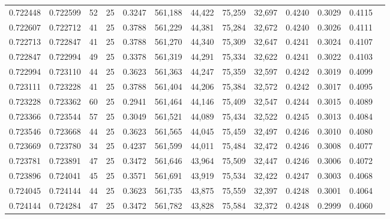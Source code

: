 \begin{tabular}{rrrrrrrrrrrrr}
0.722448 & 0.722599 &    52 &  25 &                                     0.3247 & 561,188 &  44,422 &  75,259 &  32,697 & 0.4240 & 0.3029 & 0.4115 \\
0.722607 & 0.722712 &    41 &  25 &                                     0.3788 & 561,229 &  44,381 &  75,284 &  32,672 & 0.4240 & 0.3026 & 0.4111 \\
0.722713 & 0.722847 &    41 &  25 &                                     0.3788 & 561,270 &  44,340 &  75,309 &  32,647 & 0.4241 & 0.3024 & 0.4107 \\
0.722847 & 0.722994 &    49 &  25 &                                     0.3378 & 561,319 &  44,291 &  75,334 &  32,622 & 0.4241 & 0.3022 & 0.4103 \\
0.722994 & 0.723110 &    44 &  25 &                                     0.3623 & 561,363 &  44,247 &  75,359 &  32,597 & 0.4242 & 0.3019 & 0.4099 \\
0.723111 & 0.723228 &    41 &  25 &                                     0.3788 & 561,404 &  44,206 &  75,384 &  32,572 & 0.4242 & 0.3017 & 0.4095 \\
0.723228 & 0.723362 &    60 &  25 &                                     0.2941 & 561,464 &  44,146 &  75,409 &  32,547 & 0.4244 & 0.3015 & 0.4089 \\
0.723366 & 0.723544 &    57 &  25 &                                     0.3049 & 561,521 &  44,089 &  75,434 &  32,522 & 0.4245 & 0.3013 & 0.4084 \\
0.723546 & 0.723668 &    44 &  25 &                                     0.3623 & 561,565 &  44,045 &  75,459 &  32,497 & 0.4246 & 0.3010 & 0.4080 \\
0.723669 & 0.723780 &    34 &  25 &                                     0.4237 & 561,599 &  44,011 &  75,484 &  32,472 & 0.4246 & 0.3008 & 0.4077 \\
0.723781 & 0.723891 &    47 &  25 &                                     0.3472 & 561,646 &  43,964 &  75,509 &  32,447 & 0.4246 & 0.3006 & 0.4072 \\
0.723896 & 0.724041 &    45 &  25 &                                     0.3571 & 561,691 &  43,919 &  75,534 &  32,422 & 0.4247 & 0.3003 & 0.4068 \\
0.724045 & 0.724144 &    44 &  25 &                                     0.3623 & 561,735 &  43,875 &  75,559 &  32,397 & 0.4248 & 0.3001 & 0.4064 \\
0.724144 & 0.724284 &    47 &  25 &                                     0.3472 & 561,782 &  43,828 &  75,584 &  32,372 & 0.4248 & 0.2999 & 0.4060 \\

\end{tabular}

